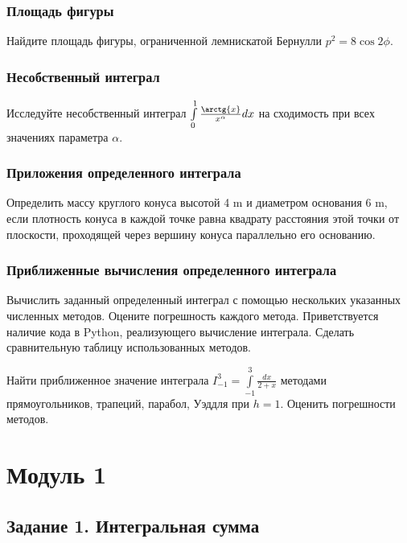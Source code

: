 \documentclass{article}
\renewcommand{\thesubsection}{Задание \arabic{subsection}.}
\begin{document}
\subsection{Площадь фигуры}

Найдите площадь фигуры, ограниченной лемнискатой Бернулли $p^2 = 8 \cos{2\phi}$.

\subsection{Несобственный интеграл}

Исследуйте несобственный интеграл $\int\limits_{0}^{1}\frac{\arctg{x}}{x^\alpha}dx$ на сходимость при всех значениях параметра $\alpha$.



\subsection{Приложения определенного интеграла}

Определить массу круглого конуса высотой 4 \si{\metre} и диаметром основания 6 \si{\metre}, если плотность конуса в каждой точке равна квадрату расстояния этой точки от плоскости, проходящей через вершину конуса параллельно его основанию.

\subsection{Приближенные вычисления определенного интеграла}

Вычислить заданный определенный интеграл с помощью нескольких указанных численных методов. Оцените погрешность каждого метода. Приветствуется наличие кода в Python, реализующего вычисление интеграла. Сделать сравнительную таблицу использованных методов.

Найти приближенное значение интеграла
$ I_{-1}^{3} = \int\limits_{-1}^{3}\frac{dx}{2+x} $
методами прямоугольников, трапеций, парабол, Уэддля при $h = 1$. Оценить погрешности методов.



\renewcommand{\thesubsection}{\arabic{subsection}.}

\chapter{Модуль 1}

\section{Задание 1. Интегральная сумма}
\end{document}
